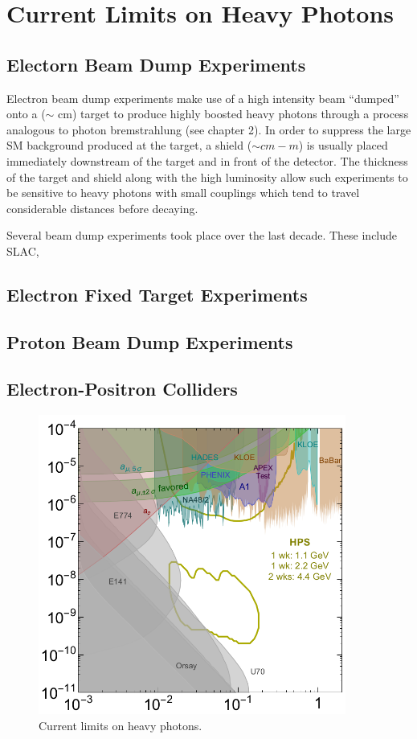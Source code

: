 \section{Current Limits on Heavy Photons}

\subsection{Electorn Beam Dump Experiments}

Electron beam dump experiments make use of a high intensity beam ``dumped'' onto
a ($\sim$ cm) target to produce highly boosted heavy photons through a process
analogous to photon bremstrahlung (see chapter 2).  In order to suppress the 
large SM background produced at the target, a shield ($\sim cm - m$) is usually
placed immediately downstream of the target and in front of the detector.  The
thickness of the target and shield along with the high luminosity allow such 
experiments to be sensitive to heavy photons with small couplings which tend to
travel considerable distances before decaying.  

Several beam dump experiments took place over the last decade. These include 
SLAC, 

\subsection{Electron Fixed Target Experiments}

\subsection{Proton Beam Dump Experiments}

\subsection{Electron-Positron Colliders}

\begin{figure}[t]
    \centering
    \includegraphics[width=0.9\textwidth]{images/ap_current_limits.png}
    \caption{Current limits on heavy photons.}
    \label{fig:svt_layout_render}
\end{figure}
